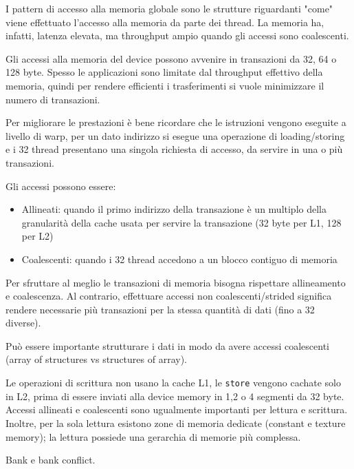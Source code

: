 \begin{questions}
\begin{solution}
        I pattern di accesso alla memoria globale sono le strutture riguardanti "come" viene effettuato l'accesso alla memoria da parte dei thread. La memoria ha, infatti, latenza elevata, ma throughput ampio quando gli accessi sono coalescenti.
        
        Gli accessi alla memoria del device possono avvenire in transazioni da 32, 64 o 128 byte. Spesso le applicazioni sono limitate dal throughput effettivo della memoria, quindi per rendere efficienti i trasferimenti si vuole minimizzare il numero di transazioni. 
        
        Per migliorare le prestazioni è bene ricordare che le istruzioni vengono eseguite a livello di warp, per un dato indirizzo si esegue una operazione di loading/storing e i 32 thread presentano una singola richiesta di accesso, da servire in una o più transazioni.
        
        Gli accessi possono essere:
        \begin{itemize}
            \item Allineati: quando il primo indirizzo della transazione è un multiplo della granularità della cache usata per servire la transazione (32 byte per L1, 128 per L2)
            
            \item Coalescenti: quando i 32 thread accedono a un blocco contiguo di memoria
        \end{itemize}
        
        Per sfruttare al meglio le transazioni di memoria bisogna rispettare allineamento e coalescenza. Al contrario, effettuare accessi non coalescenti/strided significa rendere necessarie più transazioni per la stessa quantità di dati (fino a 32 diverse).
        
        Può essere importante strutturare i dati in modo da avere accessi coalescenti (array of structures vs structures of array).
        
        Le operazioni di scrittura non usano la cache L1, le \texttt{store} vengono cachate solo in L2, prima di essere inviati alla device memory in 1,2 o 4 segmenti da 32 byte. Accessi allineati e coalescenti sono ugualmente importanti per lettura e scrittura. Inoltre, per la sola lettura esistono zone di memoria dedicate (constant e texture memory); la lettura possiede una gerarchia di memorie più complessa.
    \end{solution}
    
    \question Bank e bank conflict.
    

\end{questions}

